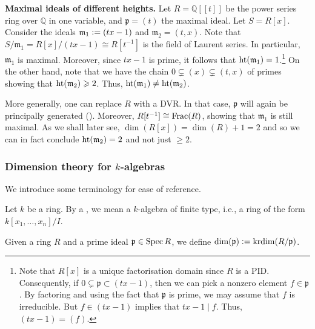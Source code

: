 \documentclass[12pt]{article}
\begin{document}
\textbf{Maximal ideals of different heights.} \newline
Let $R = \mathbb{Q}[\![t]\!]$ be the power series ring over $\mathbb{Q}$ in one variable, and $\mathfrak{p} = (t)$ the maximal ideal. \newline
Let $S = R[x]$. \newline
Consider the ideals $\mathfrak{m}_{1} \vcentcolon= (tx - 1)$ and $\mathfrak{m}_{2} = (t, x)$. \newline
Note that $S/\mathfrak{m}_{1} = R[x]/(tx - 1) \cong R[t^{-1}]$ is the field of Laurent series. In particular, $\mathfrak{m}_{1}$ is maximal. Moreover, since $tx - 1$ is prime, it follows that $\operatorname{ht}(\mathfrak{m}_{1}) = 1$.\footnote{Note that $R[x]$ is a unique factorisation domain since $R$ is a PID. Consequently, if $0 \subsetneq \mathfrak{p} \subset (tx - 1)$, then we can pick a nonzero element $f \in \mathfrak{p}$. By factoring and using the fact that $\mathfrak{p}$ is prime, we may assume that $f$ is irreducible. But $f \in (tx - 1)$ implies that $tx - 1 \mid f$. Thus, $(tx - 1) = (f)$.} \newline
On the other hand, note that we have the chain $0 \subsetneq (x) \subsetneq (t, x)$ of primes showing that $\operatorname{ht}(\mathfrak{m}_{2}) \geqslant 2$. Thus, $\operatorname{ht}(\mathfrak{m}_{1}) \neq \operatorname{ht}(\mathfrak{m}_{2})$.

More generally, one can replace $R$ with a DVR. In that case, $\mathfrak{p}$ will again be principally generated (). Moreover, $R[t^{-1}] \cong \operatorname{Frac}(R)$, showing that $\mathfrak{m}_{1}$ is still maximal. \newline
As we shall later see, $\dim(R[x]) = \dim(R) + 1 = 2$ and so we can in fact conclude $\operatorname{ht}(\mathfrak{m}_{2}) = 2$ and not just $\ge 2$.

\subsubsection{Dimension theory for \texorpdfstring{$k$}{k}-algebras}

We introduce some terminology for ease of reference.

\begin{defn}
	Let $k$ be a ring. By a , we mean a $k$-algebra of finite type, i.e., a ring of the form $k[x_{1}, \ldots, x_{n}]/I$. 
\end{defn}

\begin{defn}
	Given a ring $R$ and a prime ideal $\mathfrak{p} \in \operatorname{Spec} R$, we define $\dim(\mathfrak{p}) \vcentcolon= \operatorname{krdim}(R/\mathfrak{p})$.
\end{defn}
\end{document}
